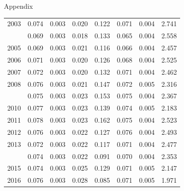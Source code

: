 \documentclass[10pt,ignorenonframetext,]{beamer}
\begin{document}
\begin{frame}[allowframebreaks]{Appendix}
\begin{longtable}[t]{rrrrrrrl}
2003 & 0.074 & 0.003 & 0.020 & 0.122 & 0.071 & 0.004 & 2.741\\
\addlinespace
2004 & 0.069 & 0.003 & 0.018 & 0.133 & 0.065 & 0.004 & 2.558\\
2005 & 0.069 & 0.003 & 0.021 & 0.116 & 0.066 & 0.004 & 2.457\\
2006 & 0.071 & 0.003 & 0.020 & 0.126 & 0.068 & 0.004 & 2.525\\
2007 & 0.072 & 0.003 & 0.020 & 0.132 & 0.071 & 0.004 & 2.462\\
2008 & 0.076 & 0.003 & 0.021 & 0.147 & 0.072 & 0.005 & 2.316\\
\addlinespace
2009 & 0.075 & 0.003 & 0.023 & 0.153 & 0.075 & 0.004 & 2.367\\
2010 & 0.077 & 0.003 & 0.023 & 0.139 & 0.074 & 0.005 & 2.183\\
2011 & 0.078 & 0.003 & 0.023 & 0.162 & 0.075 & 0.004 & 2.523\\
2012 & 0.076 & 0.003 & 0.022 & 0.127 & 0.076 & 0.004 & 2.493\\
2013 & 0.072 & 0.003 & 0.022 & 0.117 & 0.071 & 0.004 & 2.477\\
\addlinespace
2014 & 0.074 & 0.003 & 0.022 & 0.091 & 0.070 & 0.004 & 2.353\\
2015 & 0.074 & 0.003 & 0.025 & 0.129 & 0.071 & 0.005 & 2.147\\
2016 & 0.076 & 0.003 & 0.028 & 0.085 & 0.071 & 0.005 & 1.971\\*
\end{longtable}\endgroup{}

\end{frame}
\end{document}

